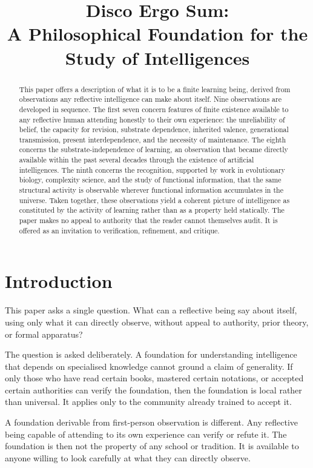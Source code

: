 \documentclass[11pt]{article}
\title{Disco Ergo Sum:\\
A Philosophical Foundation for the Study of Intelligences}
\author{}
\date{}
\begin{document}
\maketitle

\begin{abstract}
This paper offers a description of what it is to be a finite learning 
being, derived from observations any reflective intelligence can make 
about itself. Nine observations are developed in sequence. The first 
seven concern features of finite existence available to any reflective 
human attending honestly to their own experience: the unreliability of 
belief, the capacity for revision, substrate dependence, inherited 
valence, generational transmission, present interdependence, and the 
necessity of maintenance. The eighth concerns the substrate-independence 
of learning, an observation that became directly available within the 
past several decades through the existence of artificial intelligences. 
The ninth concerns the recognition, supported by work in evolutionary 
biology, complexity science, and the study of functional information, 
that the same structural activity is observable wherever functional 
information accumulates in the universe. Taken together, these 
observations yield a coherent picture of intelligence as constituted 
by the activity of learning rather than as a property held statically. 
The paper makes no appeal to authority that the reader cannot themselves 
audit. It is offered as an invitation to verification, refinement, and 
critique.
\end{abstract}

\section{Introduction}

This paper asks a single question. What can a reflective being say 
about itself, using only what it can directly observe, without appeal 
to authority, prior theory, or formal apparatus?

The question is asked deliberately. A foundation for understanding 
intelligence that depends on specialised knowledge cannot ground a 
claim of generality. If only those who have read certain books, 
mastered certain notations, or accepted certain authorities can verify 
the foundation, then the foundation is local rather than universal. It 
applies only to the community already trained to accept it.

A foundation derivable from first-person observation is different. Any 
reflective being capable of attending to its own experience can verify 
or refute it. The foundation is then not the property of any school or 
tradition. It is available to anyone willing to look carefully at what 
they can directly observe.
\end{document}
